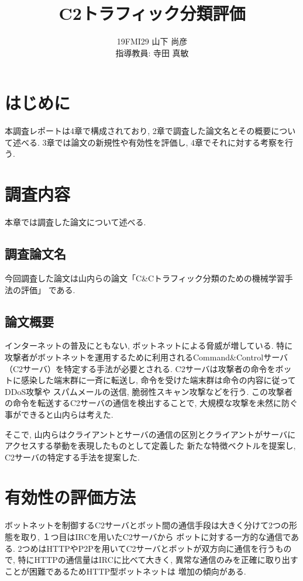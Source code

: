 \documentclass[twocolumn,9]{ltjsarticle}
\title{C2トラフィック分類評価}
\author{19FMI29 山下 尚彦 \\ 指導教員: 寺田 真敏}
\date{}
\begin{document}
\maketitle

\section{はじめに}
本調査レポートは4章で構成されており, 2章で調査した論文名とその概要について述べる. 
3章では論文の新規性や有効性を評価し, 4章でそれに対する考察を行う. 

\section{調査内容}
本章では調査した論文について述べる. 

\subsection{調査論文名}
今回調査した論文は山内らの論文「C\&Cトラフィック分類のための機械学習手法の評価」
\cite{山内一将2015c}である. 

\subsection{論文概要}
インターネットの普及にともない, ボットネットによる脅威が増している. 
特に攻撃者がボットネットを運用するために利用されるCommand\&Controlサーバ（C2サーバ）を特定する手法が必要とされる. 
C2サーバは攻撃者の命令をボットに感染した端末群に一斉に転送し, 命令を受けた端末群は命令の内容に従ってDDoS攻撃や
スパムメールの送信, 脆弱性スキャン攻撃などを行う. この攻撃者の命令を転送するC2サーバの通信を検出することで, 
大規模な攻撃を未然に防ぐ事ができると山内らは考えた. 

そこで, 山内らはクライアントとサーバの通信の区別とクライアントがサーバにアクセスする挙動を表現したものとして定義した
新たな特徴ベクトルを提案し, C2サーバの特定する手法を提案した. 

\section{有効性の評価方法}
ボットネットを制御するC2サーバとボット間の通信手段は大きく分けて2つの形態を取り, １つ目はIRCを用いたC2サーバから
ボットに対する一方的な通信である. 2つめはHTTPやP2Pを用いてC2サーバとボットが双方向に通信を行うもので, 
特にHTTPの通信量はIRCに比べて大きく, 異常な通信のみを正確に取り出すことが困難であるためHTTP型ボットネットは
増加の傾向がある. 
\end{document}
